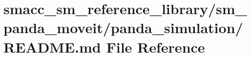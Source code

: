 \hypertarget{smacc__sm__reference__library_2sm__panda__moveit_2panda__simulation_2README_8md}{}\section{smacc\+\_\+sm\+\_\+reference\+\_\+library/sm\+\_\+panda\+\_\+moveit/panda\+\_\+simulation/\+R\+E\+A\+D\+ME.md File Reference}
\label{smacc__sm__reference__library_2sm__panda__moveit_2panda__simulation_2README_8md}
